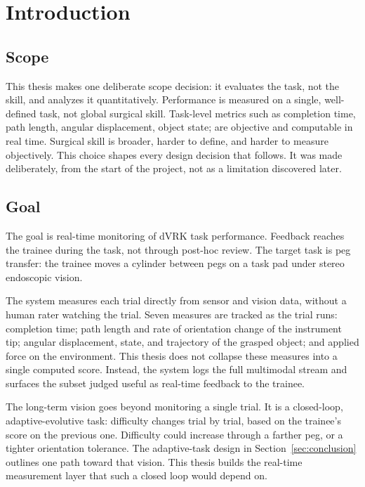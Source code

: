 \section{Introduction}

\subsection{Scope}
\label{subsec:scope}

This thesis makes one deliberate scope decision: it evaluates the task,
not the skill, and analyzes it quantitatively. Performance is measured
on a single, well-defined task, not global surgical skill. Task-level
metrics such as completion time, path length, angular displacement, object
state; are objective and computable in real time. Surgical skill is
broader, harder to define, and harder to measure objectively. This
choice shapes every design decision that follows. It was made
deliberately, from the start of the project, not as a limitation
discovered later.

\subsection{Goal}
\label{subsec:goal}

The goal is real-time monitoring of dVRK task performance. Feedback
reaches the trainee during the task, not through post-hoc review. The
target task is peg transfer: the trainee moves a cylinder between pegs on
a task pad under stereo endoscopic vision.

The system measures each trial directly from sensor and vision data,
without a human rater watching the trial. Seven measures are tracked as
the trial runs: completion time; path length and rate of orientation
change of the instrument tip; angular displacement, state, and
trajectory of the grasped object; and applied force on the
environment.
This thesis does not collapse these measures into a single computed
score. Instead, the system logs the full multimodal stream and
surfaces the subset judged useful as real-time feedback to the
trainee.

The long-term vision goes beyond monitoring a single trial. It is a
closed-loop, adaptive-evolutive task: difficulty changes trial by trial,
based on the trainee's score on the previous one. Difficulty could
increase through a farther peg, or a tighter orientation tolerance. The
adaptive-task design in Section~\ref{sec:conclusion} outlines one path
toward that vision. This thesis builds the real-time measurement layer
that such a closed loop would depend on.

